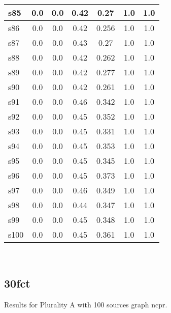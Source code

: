 \documentclass{article}
\begin{document}
\begin{tabular}{|l|c|c|c|c|c|c|}
\hline
s85 &0.0 & 0.0 & 0.42 & 0.27 & 1.0 & 1.0\\
\hline
s86 &0.0 & 0.0 & 0.42 & 0.256 & 1.0 & 1.0\\
\hline
s87 &0.0 & 0.0 & 0.43 & 0.27 & 1.0 & 1.0\\
\hline
s88 &0.0 & 0.0 & 0.42 & 0.262 & 1.0 & 1.0\\
\hline
s89 &0.0 & 0.0 & 0.42 & 0.277 & 1.0 & 1.0\\
\hline
s90 &0.0 & 0.0 & 0.42 & 0.261 & 1.0 & 1.0\\
\hline
s91 &0.0 & 0.0 & 0.46 & 0.342 & 1.0 & 1.0\\
\hline
s92 &0.0 & 0.0 & 0.45 & 0.352 & 1.0 & 1.0\\
\hline
s93 &0.0 & 0.0 & 0.45 & 0.331 & 1.0 & 1.0\\
\hline
s94 &0.0 & 0.0 & 0.45 & 0.353 & 1.0 & 1.0\\
\hline
s95 &0.0 & 0.0 & 0.45 & 0.345 & 1.0 & 1.0\\
\hline
s96 &0.0 & 0.0 & 0.45 & 0.373 & 1.0 & 1.0\\
\hline
s97 &0.0 & 0.0 & 0.46 & 0.349 & 1.0 & 1.0\\
\hline
s98 &0.0 & 0.0 & 0.44 & 0.347 & 1.0 & 1.0\\
\hline
s99 &0.0 & 0.0 & 0.45 & 0.348 & 1.0 & 1.0\\
\hline
s100 &0.0 & 0.0 & 0.45 & 0.361 & 1.0 & 1.0\\
\hline
\end{tabular}\\

\newpage

\subsection{30fct}

\noindent Results for Plurality A with 100 sources graph ncpr.
\end{document}
